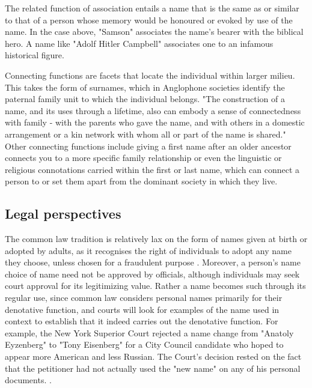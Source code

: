 The related function of association entails a name that is the same as or
similar to that of a person whose memory would be honoured or evoked by use of
the name. In the case above, "Samson" associates the name's bearer with the
biblical hero. A name like "Adolf Hitler Campbell" associates one to an
infamous historical figure. 

Connecting functions are facets that locate the individual within larger
milieu.  This takes the form of surnames, which in Anglophone societies
identify the paternal family unit to which the individual belongs. "The
construction of a name, and its uses through a lifetime, also can embody a
sense of connectedness with family - with the parents who gave the name, and
with others in a domestic arrangement or a kin network with whom all or part of
the name is shared." \parencite[711]{finch08} Other connecting functions
include giving a first name after an older ancestor connects you to a more
specific family relationship or even the linguistic or religious connotations
carried within the first or last name, which can connect a person to or set
them apart from the dominant society in which they live.

\subsection{Legal perspectives}

The common law tradition is relatively lax on the form of names given at birth
or adopted by adults, as it recognises the right of individuals to adopt any
name they choose, unless chosen for a fraudulent purpose
\parencite[403]{heymann11}. Moreover, a person's name choice of name need not
be approved by officials, although individuals may seek court approval for its
legitimizing value. Rather a name becomes such through its regular use, since
common law considers personal names primarily for their denotative function,
and courts will look for examples of the name used in context to establish that
it indeed carries out the denotative function. For example, the New York
Superior Court rejected a name change from "Anatoly Eyzenberg" to "Tony
Eisenberg" for a City Council candidate who hoped to appear more American and
less Russian. The Court's decision rested on the fact that the petitioner had
not actually used the "new name" on any of his personal documents.
\parencite{eisenberg03} \parencite[404]{heymann11}.

